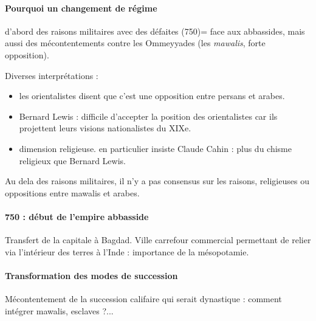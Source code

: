 \paragraph{Pourquoi un changement de régime} d'abord des raisons militaires avec des défaites (750)= face aux abbassides, mais aussi des mécontentements contre les Ommeyyades (les \textit{mawalis}, forte opposition). 

Diverses interprétations : 
\begin{itemize}
\item les orientalistes disent que c'est une opposition entre persans et arabes.
    \item Bernard Lewis : difficile d'accepter la position des orientalistes car ils projettent leurs visions nationalistes du XIXe.
    \item dimension religieuse. en particulier insiste Claude Cahin : plus du chisme religieux que Bernard Lewis. 
\end{itemize}

\begin{Synthesis}
Au dela des raisons militaires, il n'y a pas consensus sur les raisons, religieuses ou oppositions entre mawalis et arabes.
\end{Synthesis}

\paragraph{750 : début de l'empire abbasside} Transfert de la capitale à Bagdad. Ville carrefour commercial permettant de relier via l'intérieur des terres \Med à l'Inde : importance de la mésopotamie. 

\paragraph{Transformation des modes de succession} Mécontentement de la succession califaire qui serait dynastique : comment intégrer mawalis, esclaves ?...


